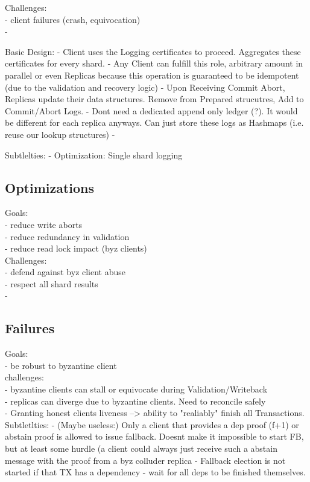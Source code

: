 Challenges:\\
- client failures (crash, equivocation)\\
- 

Basic Design:
- Client uses the Logging certificates to proceed. Aggregates these certificates for every shard.
- Any Client can fulfill this role, arbitrary amount in parallel or even Replicas because this operation is guaranteed to be idempotent (due to the validation and recovery logic)
- Upon Receiving Commit Abort, Replicas update their data structures. Remove from Prepared strucutres, Add to Commit/Abort Logs. 
- Dont need a dedicated append only ledger (?). It would be different for each replica anyways. Can just store these logs as Hashmaps (i.e. reuse our lookup structures)
- 

Subtlelties:
- Optimization: Single shard logging

\subsection{Optimizations}
Goals:\\
- reduce write aborts\\
- reduce redundancy in validation\\
- reduce read lock impact (byz clients)\\

Challenges:\\
- defend against byz client abuse\\
- respect all shard results\\
- 

\subsection{Failures}
Goals:\\
- be robust to byzantine client\\


challenges:\\
- byzantine clients can stall or equivocate during Validation/Writeback\\
- replicas can diverge due to byzantine clients. Need to reconcile safely\\
- Granting honest clients liveness --> ability to "realiably" finish all Transactions.\\


Subtletlties:
- (Maybe useless:) Only a client that provides a dep proof (f+1) or abstain proof is allowed to issue fallback. Doesnt make it impossible to start FB, but at least some hurdle (a client could always just receive such a abstain message with the proof from a byz colluder replica
- Fallback election is not started if that TX has a dependency - wait for all deps to be finished themselves.


